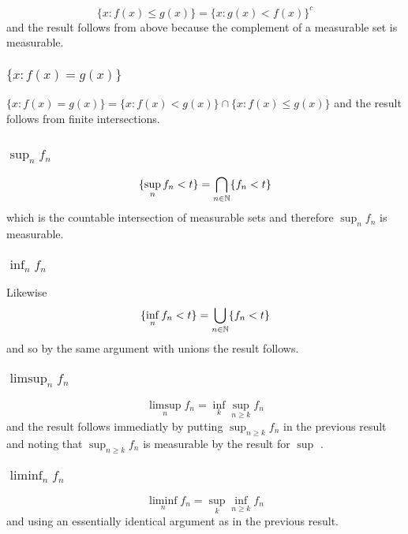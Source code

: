 \documentclass{unswmaths}
\begin{document}
$$ \{ x : f(x) \leq g(x) \} = \{ x : g(x) < f(x) \}^{c} $$ and the result follows from above because the complement of a measurable set is measurable.

\subsubsection{$\{ x : f(x) = g(x) \}$}

$\{ x : f(x) = g(x) \} = \{ x : f(x) < g(x) \} \cap \{ x : f(x) \leq g(x) \} $ and the result follows from finite intersections.

\subsection{}
\subsubsection{ $ \sup_n f_n $ }

$$
    \{ \sup_n f_n < t \} = \bigcap_{n \in \mathbb{N}} \{f_n < t \}
$$
which is the countable intersection of measurable sets and therefore $ \sup_n f_n $ is measurable.

\subsubsection{ $ \inf_n f_n $ }

Likewise 
$$
    \{ \inf_n f_n < t \} = \bigcup_{n \in \mathbb{N}} \{ f_n < t \} 
$$
and so by the same argument with unions the result follows. 

\subsubsection{$ \limsup_n f_n $}
$$
    \limsup_n f_n = \inf_k \sup_{n\geq k} f_n
$$
and the result follows immediatly by putting $ \sup_{n \geq k} f_n $ in the previous result and noting that $ \sup_{n \geq k} f_n$ 
is measurable by the result for $ \sup$ .

\subsubsection{$ \liminf_n f_n $}
$$
    \liminf_n f_n = \sup_k \inf_{n\geq k} f_n
$$
and using an essentially identical argument as in the previous result.
\section{}
\end{document}

